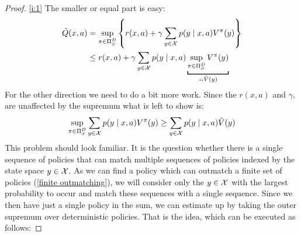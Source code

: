 \begin{proof} \ref{i:1} The smaller or equal part is easy:
	\begin{align*}
		\tilde{Q}(x,a)&= \sup_{\pi \in \detPolicy} \left\{r(x,a)
		+\gamma\sum_{y\in\cX}p(y\mid x,a) V^\pi(y)\right\}\\
		&\le r(x,a) +\gamma\sum_{y\in\cX}p(y\mid x,a) \underbracket[1pt]{\sup_{\pi \in \detPolicy}V^\pi(y)}_{=\tilde{V}(y)}
	\end{align*}
	For the other direction we need to do a bit more work. Since the \(r(x,a)\) and \(\gamma\), are unaffected by the supremum what is left to show is:
	\[
		\sup_{\pi \in \Pi_S^D}\sum_{y\in\mathcal{X}}p(y\mid x,a) V^\pi(y)
		\ge\sum_{y\in\mathcal{X}}p(y\mid x,a)\tilde{V}(y)
	\]
	This problem should look familiar. It is the question whether there is a single sequence of policies that can match multiple sequences of policies indexed by the state space \(y\in\mathcal{X}\).	As we can find a policy which can outmatch a finite set of policies (\ref{finite outmatching}), we will consider only the \(y\in\mathcal{X}\) with the largest probability to occur and match these sequences with a single sequence. Since we then have just a single policy in the sum, we can estimate up by taking the outer supremum over deterministic policies. That is the idea, which can be executed as follows:
	

\end{proof}
